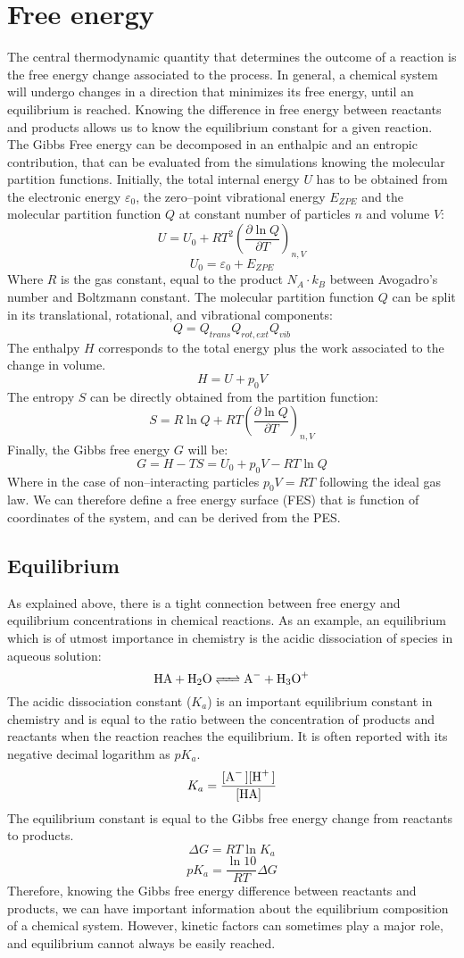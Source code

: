 
\section{Free energy}
The central thermodynamic quantity that determines the outcome of a reaction is the free energy change associated to the process. In general, a chemical system will undergo changes in a direction that minimizes its free energy, until an equilibrium is reached. Knowing the difference in free energy between reactants and products allows us to know the equilibrium constant for a given reaction. The Gibbs Free energy can be decomposed in an enthalpic and an entropic contribution, that can be evaluated from the simulations knowing the molecular partition functions. Initially, the total internal energy $U$ has to be obtained from the electronic energy $\varepsilon_0$, the zero--point vibrational energy $E_{ZPE}$ and the molecular partition function $Q$ at constant number of particles $n$ and volume $V$:
\[
U = U_{0} + R T^{2}\left(\frac{\partial \ln Q}{\partial T}\right)_{n,V}
\]
\[ U_{0} = \varepsilon_{0} + E_{ZPE} \]
Where $R$ is the gas constant, equal to the product $N_{A}\cdot k_{B}$ between Avogadro's number and Boltzmann constant. The molecular partition function $Q$ can be split in its translational, rotational, and vibrational components:
\[
Q = Q_{trans}Q_{rot, ext}Q_{vib}
\]
The enthalpy $H$ corresponds to the total energy plus the work associated to the change in volume.
\[
H = U + p_{0}V
\] 
The entropy $S$ can be directly obtained from the partition function:
\[
S = R \ln Q + RT \left(\frac{\partial \ln Q}{\partial
T}\right)_{n,V}
\]
Finally, the Gibbs free energy $G$ will be:
\[
G = H - TS = U_{0} + p_{0}V - RT\ln Q
\]
Where in the case of non--interacting particles $p_{0}V = RT$ following the ideal gas law. We can therefore define a free energy surface (FES) that is function of coordinates of the system, and can be derived from the PES.

\subsection*{Equilibrium}
As explained above, there is a tight connection between free energy and equilibrium concentrations in chemical reactions. As an example, an equilibrium which is of utmost importance in chemistry is the acidic dissociation of species in aqueous solution:
\[
\ce{HA + H2O <=> A- + H3O+}
\]
The acidic dissociation constant ($K_a$) is an important equilibrium constant in chemistry and is equal to the ratio between the concentration of products and reactants when the reaction reaches the equilibrium. It is often reported with its negative decimal logarithm as $pK_a$.
\[
K_a=\dfrac{\ce{[A- ][H+ ]}}{\ce{[HA]}} 
\]
The equilibrium constant is equal to the Gibbs free energy change from reactants to products.
\[
\Delta G = RT \ln K_a
\]
\[
pK_a = \dfrac{\ln 10}{RT} \Delta G
\]
Therefore, knowing the Gibbs free energy difference between reactants and products, we can have important information about the equilibrium composition of a chemical system. However, kinetic factors can sometimes play a major role, and equilibrium cannot always be easily reached.

